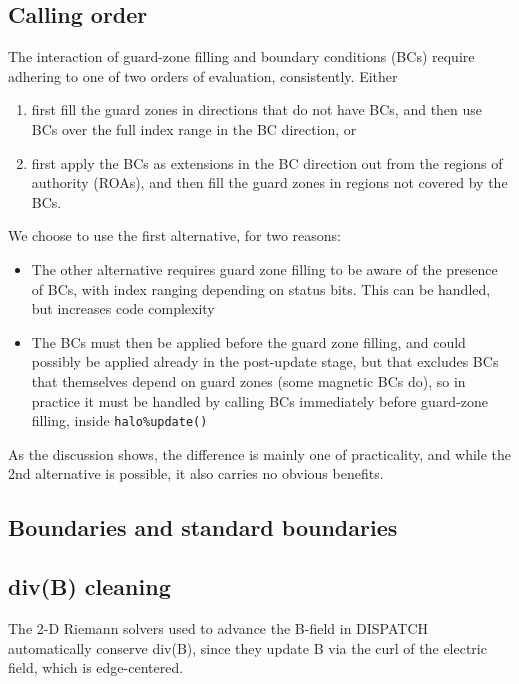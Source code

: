 \documentclass[paper=a4,fontsize=11pt]{scrartcl}
\numberwithin{equation}{section}		%
\numberwithin{figure}{section}			%
\numberwithin{table}{section}				%
\begin{document}
\subsection{Calling order}
The interaction of guard-zone filling and boundary conditions (BCs) require adhering to one of two orders of evaluation, consistently.  Either
\begin{enumerate}
    \item first fill the guard zones in directions that do not have BCs, and then use BCs over the full index range in the BC direction, or
    \item first apply the BCs as extensions in the BC direction out from the regions of authority (ROAs), and then fill the guard zones in regions not covered by the BCs.
\end{enumerate}
We choose to use the first alternative, for two reasons:
\begin{itemize}
    \item The other alternative requires guard zone filling to be aware of the presence of BCs, with index ranging depending on status bits.  This can be handled, but increases code complexity
    \item The BCs must then be applied before the guard zone filling, and could possibly be applied already in the post-update stage, but that excludes BCs that themselves depend on guard zones (some magnetic BCs do), so in practice it must be handled by calling BCs immediately before guard-zone filling, inside \verb|halo%update()|
\end{itemize}
As the discussion shows, the difference is mainly one of practicality, and while the 2nd alternative is possible, it also carries no obvious benefits.

\subsection{Boundaries and standard boundaries}

\subsection{div(B) cleaning}

The 2-D Riemann solvers used to advance the B-field in DISPATCH automatically conserve div(B), since they update B via the curl of the electric field, which is edge-centered.
\def\uu{\mathbf{u}}
\def\BB{\mathbf{B}}
\def\divB{\nabla\cdot\BB}
\def\divb{\mathrm{div}(\BB)}
\end{document}
